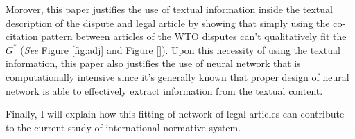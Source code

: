 Morover, this paper justifies the use of textual information inside the textual description of the dispute and legal article by showing that simply using the co-citation pattern between articles of the WTO disputes can't qualitatively fit the $G^*$ (\textit{See} Figure \ref{fig:adj} and Figure \ref{}). 
Upon this necessity of using the textual information, this paper also justifies the use of neural network that is computationally intensive since it's generally known that proper design of neural network is able to effectively extract information from the textual content.

Finally, I will explain how this fitting of network of legal articles can contribute to the current study of international normative system.
